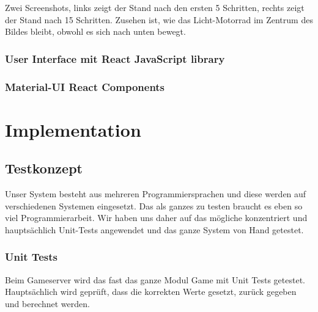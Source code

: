 \documentclass[11pt,ngerman]{article}
\begin{document}
	Zwei Screenshots, links zeigt der Stand nach den ersten 5 Schritten, rechts zeigt der Stand nach 15 Schritten. Zusehen ist, wie das Licht-Motorrad im Zentrum des Bildes bleibt, obwohl es sich nach unten bewegt.

    \subsubsection{User Interface mit React JavaScript library}

    \subsubsection{Material-UI React Components}




    \section{Implementation}


    \subsection{Testkonzept}
    Unser System besteht aus mehreren Programmiersprachen und diese werden auf verschiedenen Systemen eingesetzt. Das als ganzes zu testen braucht es eben so viel Programmierarbeit. Wir haben uns daher auf das mögliche konzentriert und hauptsächlich Unit-Tests angewendet und das ganze System von Hand getestet.

    \subsubsection{Unit Tests}
	Beim Gameserver wird das fast das ganze Modul Game mit Unit Tests getestet. Hauptsächlich wird geprüft, dass die korrekten Werte gesetzt, zurück gegeben und berechnet werden.
\end{document}
